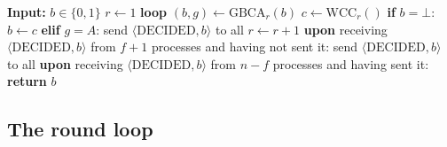 \begin{algorithm}
    \caption{Implementation of ABA. Algorithm 1 of the source blueprint, after
      Abraham, Ben-David and Yandamuri \cite{ABDY22}}
    \label{alg:aba-core}
    \begin{algorithmic}
        \State \textbf{Input:} $b \in \{0,1\}$
        \medskip
        \State $r \gets 1$
        \State \textbf{loop}
        \State\quad $(b, g) \gets \mathrm{GBCA}_r(b)$
        \State\quad $c \gets \mathrm{WCC}_r()$
        \State\quad \textbf{if} $b = \bot$:
        \State\quad\quad $b \gets c$
        \State\quad \textbf{elif} $g = A$:
        \State\quad\quad send $\langle\mathrm{DECIDED}, b\rangle$ to all
        \State\quad $r \gets r + 1$
        \medskip
        \State \textbf{upon} receiving $\langle\mathrm{DECIDED}, b\rangle$ from
          $f + 1$ processes and having not sent it:
        \State\quad send $\langle\mathrm{DECIDED}, b\rangle$ to all
        \State \textbf{upon} receiving $\langle\mathrm{DECIDED}, b\rangle$ from
          $n - f$ processes and having sent it:
        \State\quad \textbf{return} $b$
    \end{algorithmic}
\end{algorithm}


\subsection{The round loop}



